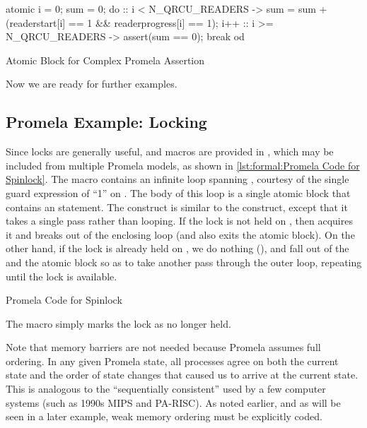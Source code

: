 \begin{listing}
\begin{VerbatimL}
atomic {
	i = 0;
	sum = 0;
	do
	:: i < N_QRCU_READERS ->
		sum = sum + (readerstart[i] == 1 &&
		             readerprogress[i] == 1);
		i++
	:: i >= N_QRCU_READERS ->
		assert(sum == 0);
		break
	od
}
\end{VerbatimL}
\caption{Atomic Block for Complex Promela Assertion}
\label{lst:formal:Atomic Block for Complex Promela Assertion}
\end{listing}

Now we are ready for further examples.

\subsection{Promela Example:
			     Locking}
\label{sec:formal:Promela Example: Locking}

\begin{fcvref}
Since locks are generally useful,  and
macros are provided in , which may be included from
multiple Promela models, as shown in
\cref{lst:formal:Promela Code for Spinlock}.
The  macro contains an infinite  loop
spanning ,
courtesy of the single guard expression of ``1'' on .
The body of this loop is a single atomic block that contains
an  statement.
The  construct is similar to the  construct, except
that it takes a single pass rather than looping.
If the lock is not held on , then
 acquires it and
 breaks out of the enclosing  loop (and also exits
the atomic block).
On the other hand, if the lock is already held on ,
we do nothing (), and fall out of the  and the
atomic block so as to take another pass through the outer
loop, repeating until the lock is available.
\end{fcvref}

\begin{listing}

\caption{Promela Code for Spinlock}
\label{lst:formal:Promela Code for Spinlock}
\end{listing}

The  macro simply marks the lock as no
longer held.

Note that memory barriers are not needed because Promela assumes
full ordering.
In any given Promela state, all processes agree on both the current
state and the order of state changes that caused us to arrive at
the current state.
This is analogous to the ``sequentially consistent''
used by a few computer systems (such as 1990s MIPS and PA-RISC\@).
As noted earlier, and as will be seen in a later example,
weak memory ordering must be explicitly coded.

